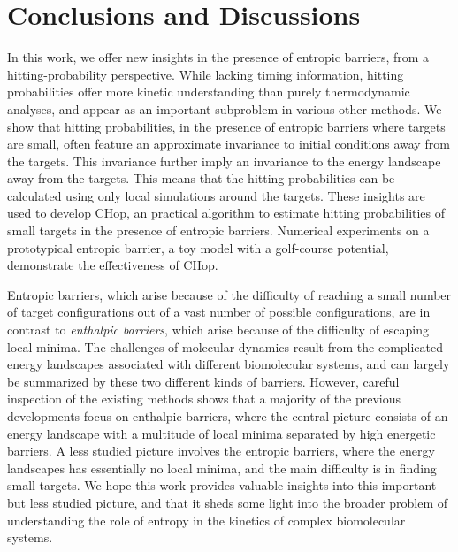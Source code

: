 \documentclass[english, aip, jcp, priprint, graphicx,floatfix]{revtex4-1}
\theoremstyle{plain}
\theoremstyle{definition}
\theoremstyle{plain}
\begin{document}
\section{Conclusions and Discussions}\label{sec:discussion}

In this work, we offer new insights in the presence of entropic barriers, from a hitting-probability perspective. While lacking timing information, hitting probabilities offer more kinetic understanding than purely thermodynamic analyses, and appear as an important subproblem in various other methods. We show that hitting probabilities, in the presence of entropic barriers where targets are small, often feature an approximate invariance to initial conditions away from the targets. This invariance further imply an invariance to the energy landscape away from the targets. This means that the hitting probabilities can be calculated using only local simulations around the targets. These insights are used to develop CHop, an practical algorithm to estimate hitting probabilities of small targets in the presence of entropic barriers. Numerical experiments on a prototypical entropic barrier, a toy model with a golf-course potential, demonstrate the effectiveness of CHop.

Entropic barriers, which arise because of the difficulty of reaching a small number of target configurations out of a vast number of possible configurations, are in contrast to \emph{enthalpic barriers}, which arise because of the difficulty of escaping local minima. The challenges of molecular dynamics result from the complicated energy landscapes associated with different biomolecular systems, and can largely be summarized by these two different kinds of barriers. However, careful inspection of the existing methods shows that a majority of the previous developments focus on enthalpic barriers, where the central picture consists of an energy landscape with a multitude of local minima separated by high energetic barriers. A less studied picture involves the entropic barriers, where the energy landscapes has essentially no local minima, and the main difficulty is in finding small targets. We hope this work provides valuable insights into this important but less studied picture, and that it sheds some light into the broader problem of understanding the role of entropy in the kinetics of complex biomolecular systems. 
\end{document}
